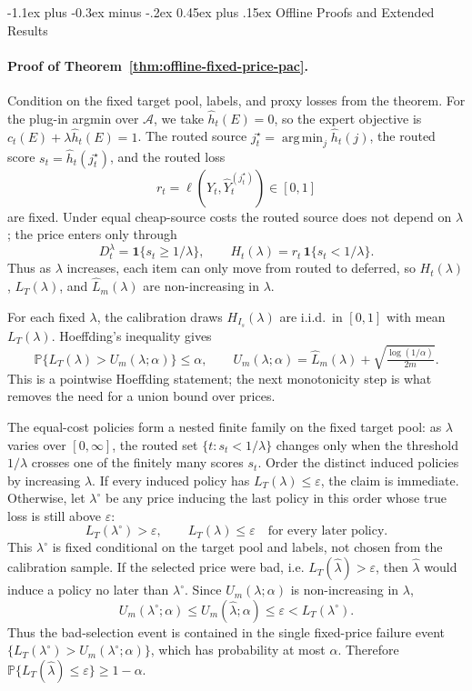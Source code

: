 \documentclass[11pt]{article}
\makeatletter
\renewcommand\subsection{\@startsection{subsection}{2}{\z@}%
  {-1.1ex plus -0.3ex minus -.2ex}%
  {0.45ex plus .15ex}%
  {\normalfont\large\bfseries}}
\newcommand{\Pp}{\mathbb{P}}
\newcommand{\ind}[1]{\mathbf{1}\{#1\}}
\newcommand{\calA}{\mathcal{A}}
\newcommand{\hatY}{\widehat Y}
\newcommand{\hath}{\widehat h}
\newcommand{\hatL}{\widehat L}
\newcommand{\eps}{\varepsilon}
\newcommand{\argmin}{\operatorname*{arg\,min}}
\makeatother
\begin{document}
\subsection{Offline Proofs and Extended Results}
\label{app:offline-proofs}
\paragraph{Proof of Theorem~\ref{thm:offline-fixed-price-pac}.}
Condition on the fixed target pool, labels, and proxy losses from the theorem.
For the plug-in argmin over \(\calA\), we take \(\hath_t(E)=0\), so the expert
objective is \(c_t(E)+\lambda\hath_t(E)=1\).
The routed source \(j_t^\star=\argmin_j\hath_t(j)\), the routed score
\(s_t=\hath_t(j_t^\star)\), and the routed loss
\[
    r_t=\ell(Y_t,\hatY_t^{(j_t^\star)})\in[0,1]
\]
are fixed. Under equal cheap-source costs the routed source does not depend on
\(\lambda\); the price enters only through
\[
    D_t^\lambda=\ind{s_t\ge1/\lambda},
    \qquad
    H_t(\lambda)=r_t\,\ind{s_t<1/\lambda}.
\]
Thus as \(\lambda\) increases, each item can only move from routed to deferred,
so \(H_t(\lambda)\), \(L_T(\lambda)\), and \(\hatL_m(\lambda)\) are
non-increasing in \(\lambda\).

For each fixed \(\lambda\), the calibration draws \(H_{I_s}(\lambda)\) are
i.i.d.\ in \([0,1]\) with mean \(L_T(\lambda)\). Hoeffding's inequality gives
\[
    \Pp\bigl\{L_T(\lambda)>U_m(\lambda;\alpha)\bigr\}\le\alpha,
    \qquad
    U_m(\lambda;\alpha)=\hatL_m(\lambda)+\sqrt{\tfrac{\log(1/\alpha)}{2m}}.
\]
This is a pointwise Hoeffding statement; the next monotonicity step is what removes
the need for a union bound over prices.

The equal-cost policies form a nested finite family on the fixed target pool:
as \(\lambda\) varies over \([0,\infty]\), the routed set
\(\{t:s_t<1/\lambda\}\) changes only when the threshold \(1/\lambda\) crosses one
of the finitely many scores \(s_t\). Order the distinct induced policies by
increasing \(\lambda\). If every induced policy has \(L_T(\lambda)\le\eps\), the
claim is immediate. Otherwise, let \(\lambda^\circ\) be any price inducing the
last policy in this order whose true loss is still above \(\eps\):
\[
    L_T(\lambda^\circ)>\eps,
    \qquad
    L_T(\lambda)\le\eps
    \quad\text{for every later policy.}
\]
This \(\lambda^\circ\) is fixed conditional on the target pool and labels, not
chosen from the calibration sample. If the selected price were bad, i.e.
\(L_T(\hat\lambda)>\eps\), then \(\hat\lambda\) would induce a policy no later
than \(\lambda^\circ\). Since \(U_m(\lambda;\alpha)\) is non-increasing in
\(\lambda\),
\[
    U_m(\lambda^\circ;\alpha)
    \le
    U_m(\hat\lambda;\alpha)
    \le
    \eps
    <
    L_T(\lambda^\circ).
\]
Thus the bad-selection event is contained in the single fixed-price failure
event \(\{L_T(\lambda^\circ)>U_m(\lambda^\circ;\alpha)\}\), which has
probability at most \(\alpha\). Therefore
\(\Pp\{L_T(\hat\lambda)\le\eps\}\ge1-\alpha\).
\end{document}
